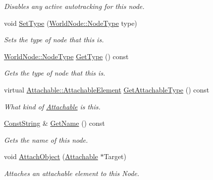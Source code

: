 \begin{DoxyCompactItemize}
\begin{DoxyCompactList}\small\item\em Disables any active autotracking for this node. \item\end{DoxyCompactList}\item 
void \hyperlink{classphys_1_1WorldNode_abc4cf216177c0a3f4397c83fe3b58e75}{SetType} (\hyperlink{classphys_1_1WorldNode_a0b178b06aa411b00c4c2ccd926d9bf5a}{WorldNode::NodeType} type)
\begin{DoxyCompactList}\small\item\em Sets the type of node that this is. \item\end{DoxyCompactList}\item 
\hyperlink{classphys_1_1WorldNode_a0b178b06aa411b00c4c2ccd926d9bf5a}{WorldNode::NodeType} \hyperlink{classphys_1_1WorldNode_a438a26ff58e93e611deea737a95ae654}{GetType} () const 
\begin{DoxyCompactList}\small\item\em Gets the type of node that this is. \item\end{DoxyCompactList}\item 
virtual \hyperlink{classphys_1_1Attachable_acd1fca033e7cc0bb3024a92d466d213a}{Attachable::AttachableElement} \hyperlink{classphys_1_1WorldNode_a166d3204c44959c1c77498f1f03e1ec9}{GetAttachableType} () const 
\begin{DoxyCompactList}\small\item\em What kind of \hyperlink{classphys_1_1Attachable}{Attachable} is this. \item\end{DoxyCompactList}\item 
\hyperlink{namespacephys_a5ce5049f8b4bf88d6413c47b504ebb31}{ConstString} \& \hyperlink{classphys_1_1WorldNode_ae3c12e7aced8f84e2191a5e08e2767a8}{GetName} () const 
\begin{DoxyCompactList}\small\item\em Gets the name of this node. \item\end{DoxyCompactList}\item 
void \hyperlink{classphys_1_1WorldNode_a25b5a05bb87967fe21f153ce4418b43e}{AttachObject} (\hyperlink{classphys_1_1Attachable}{Attachable} $\ast$Target)
\begin{DoxyCompactList}\small\item\em Attaches an attachable element to this Node. \item\end{DoxyCompactList}\item 

\end{DoxyCompactItemize}
